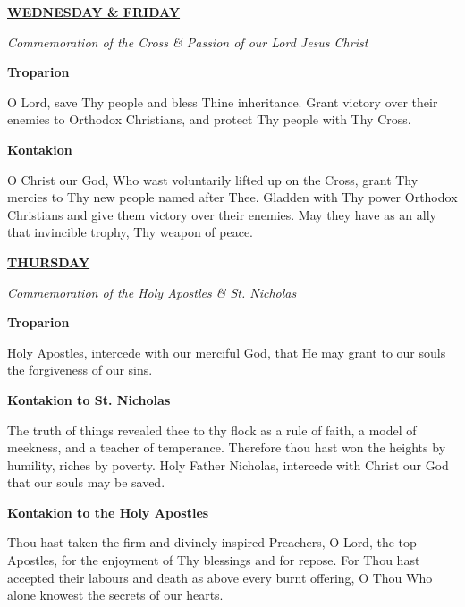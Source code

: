\documentclass{article}
\begin{document}
\noindent
\centering
{
\footnotesize
\underline{\textbf{WEDNESDAY \& FRIDAY}}
}
\smallskip

\noindent
\centering
{
\color{red}
\footnotesize
\textit{Commemoration of the Cross \& Passion of our Lord Jesus Christ}
}
\smallskip

\noindent
\centering
{
\footnotesize
\textbf{Troparion}
}

\noindent
\justifying
{
\scriptsize
O Lord, save Thy people and bless Thine inheritance. Grant victory over their enemies to Orthodox Christians, and protect Thy people with Thy Cross.
}
\smallskip

\noindent
\centering
{
\footnotesize
\textbf{Kontakion}
}

\noindent
\justifying
{
\scriptsize
O Christ our God, Who wast voluntarily lifted up on the Cross, grant Thy mercies to Thy new people named after Thee. Gladden with Thy power Orthodox Christians and give them victory over their enemies. May they have as an ally that invincible trophy, Thy weapon of peace.
}
\newpage

\noindent
\centering
{
\footnotesize
\underline{\textbf{THURSDAY}}
}
\smallskip

\noindent
\centering
{
\color{red}
\footnotesize
\textit{Commemoration of the Holy Apostles \& St. Nicholas}
}
\smallskip

\noindent
\centering
{
\footnotesize
\textbf{Troparion}
}

\noindent
\justifying
{
\scriptsize
Holy Apostles, intercede with our merciful God, that He may grant to our souls the forgiveness of our sins.
}
\smallskip

\noindent
\centering
{
\footnotesize
\textbf{Kontakion to St. Nicholas}
}

\noindent
\justifying
{
\scriptsize
The truth of things revealed thee to thy flock as a rule of faith, a model of meekness, and a teacher of temperance. Therefore thou hast won the heights by humility, riches by poverty. Holy Father Nicholas, intercede with Christ our God that our souls may be saved.
}
\smallskip

\noindent
\centering
{
\footnotesize
\textbf{Kontakion to the Holy Apostles}
}

\noindent
\justifying
{
\scriptsize
Thou hast taken the firm and divinely inspired Preachers, O Lord, the top Apostles, for the enjoyment of Thy blessings and for repose. For Thou hast accepted their labours and death as above every burnt offering, O Thou Who alone knowest the secrets of our hearts.
}
\medskip
\end{document}
